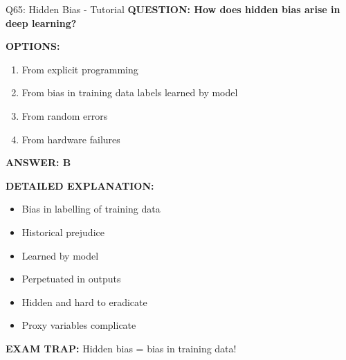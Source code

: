 \documentclass[8pt]{beamer}
\begin{document}
	\begin{frame}{Q65: Hidden Bias - Tutorial}
		\fontsize{6.5}{7.5}\selectfont
		\textbf{QUESTION: How does hidden bias arise in deep learning?}
		
		\vspace{0.1cm}
		\textbf{OPTIONS:}
		\begin{enumerate}
			\item From explicit programming
			\item From bias in training data labels learned by model
			\item From random errors
			\item From hardware failures
		\end{enumerate}
		
		\vspace{0.1cm}
		\textcolor{myblue}{\textbf{ANSWER: B}}
		
		\vspace{0.1cm}
		\textbf{DETAILED EXPLANATION:}
		\begin{itemize}
			\item Bias in labelling of training data
			\item Historical prejudice
			\item Learned by model
			\item Perpetuated in outputs
			\item Hidden and hard to eradicate
			\item Proxy variables complicate
		\end{itemize}
		
		\vspace{0.1cm}
		\textcolor{myred}{\textbf{EXAM TRAP:}} Hidden bias = \textcolor{myblue}{bias in training data}!
	\end{frame}
	
\end{document}

